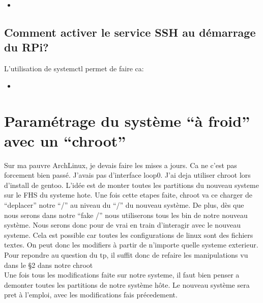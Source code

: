 \documentclass[a4paper,10pt]{article}
\newcommand{\insertcode}[2]{\begin{itemize}\item[]\end{itemize}}
\begin{document}
\insertcode{commande/9.txt}{/etc/dhcpcd.conf}
\subsection{Comment activer le service SSH au démarrage du RPi?}
L'utilisation de systemctl permet de faire ca:
\insertcode{commande/10.txt}{systemctl}
\section{Paramétrage du système ``à froid'' avec un ``chroot'' }
Sur ma pauvre ArchLinux, je devais faire les mises a jours. Ca ne c'est pas forcement bien passé. J'avais pas d'interface loop0. J'ai deja utiliser chroot lors d'install de gentoo. L'idée est de monter toutes les partitions du nouveau systeme sur le FHS du systeme hote. Une fois cette etapes faite, chroot va ce charger de ``deplacer'' notre ``/'' au niveau du ``/'' du nouveau système. De plus, dès que nous serons dans notre ``fake /''  nous utiliserons tous les bin de notre nouveau système. Nous serons donc pour de vrai en train d'interagir avec le nouveau systeme. Cela est possible car toutes les configurations de linux sont des fichiers textes. On peut donc les modifiers à partir de n'importe quelle systeme exterieur.\\
Pour repondre au question du tp, il suffit donc de refaire les manipulations vu dans le §2 dans notre chroot\\

Une fois tous les modifications faite sur notre systeme, il faut bien penser a demonter toutes les partitions de notre système hôte. Le nouveau système sera pret à l'emploi, avec les  modifications fais précedement. 
\end{document}
